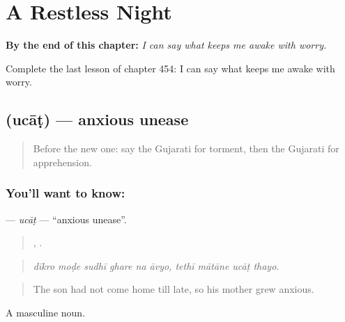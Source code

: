
\chapter{A Restless Night}
\label{ch:gu-a-restless-night}

\begin{chapteropening}
\textbf{By the end of this chapter:} \emph{I can say what keeps me awake with worry.}

Complete the last lesson of chapter 454: I can say what keeps me awake with worry.
\end{chapteropening}

\section[\texorpdfstring{\gu{ઉચાટ} (ucāṭ)}{ઉચાટ (ucāṭ)}]{ (ucāṭ) — anxious unease}

\label{lesson:GU-C454-ucat}



\begin{quote}
Before the new one: say the Gujarati for torment, then the Gujarati for apprehension.
\end{quote}

\subsection*{You'll want to know: }
\textbf{} — \emph{ucāṭ} — \textquotedblleft{}anxious unease\textquotedblright{}.

\begin{quote}
     ,    .
\end{quote}

\begin{quote}
\emph{dīkro moḍe sudhī ghare na āvyo, tethī mātāne ucāṭ thayo.}
\end{quote}

\begin{quote}
The son had not come home till late, so his mother grew anxious.
\end{quote}

A masculine noun.

